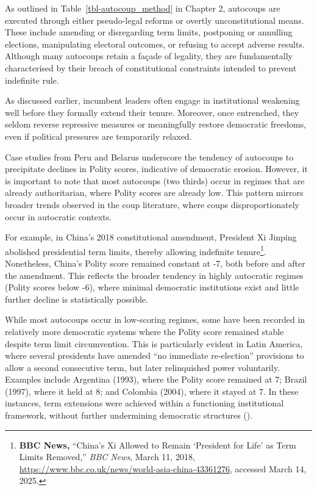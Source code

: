 \documentclass[
  12pt,
]{report}
\begin{document}
As outlined in Table~\ref{tbl-autocoup_method} in Chapter 2, autocoups
are executed through either pseudo-legal reforms or overtly
unconstitutional means. These include amending or disregarding term
limits, postponing or annulling elections, manipulating electoral
outcomes, or refusing to accept adverse results. Although many autocoups
retain a façade of legality, they are fundamentally characterised by
their breach of constitutional constraints intended to prevent
indefinite rule.

As discussed earlier, incumbent leaders often engage in institutional
weakening well before they formally extend their tenure. Moreover, once
entrenched, they seldom reverse repressive measures or meaningfully
restore democratic freedoms, even if political pressures are temporarily
relaxed.

Case studies from Peru and Belarus underscore the tendency of autocoups
to precipitate declines in Polity scores, indicative of democratic
erosion. However, it is important to note that most autocoups (two
thirds) occur in regimes that are already authoritarian, where Polity
scores are already low. This pattern mirrors broader trends observed in
the coup literature, where coups disproportionately occur in autocratic
contexts.

For example, in China's 2018 constitutional amendment, President Xi
Jinping abolished presidential term limits, thereby allowing indefinite
tenure\footnote{\textbf{BBC News,} ``China's Xi Allowed to Remain
  `President for Life' as Term Limits Removed,'' \emph{BBC News}, March
  11, 2018, \url{https://www.bbc.co.uk/news/world-asia-china-43361276},
  accessed March 14, 2025.}. Nonetheless, China's Polity score remained
constant at -7, both before and after the amendment. This reflects the
broader tendency in highly autocratic regimes (Polity scores below -6),
where minimal democratic institutions exist and little further decline
is statistically possible.

While most autocoups occur in low-scoring regimes, some have been
recorded in relatively more democratic systems where the Polity score
remained stable despite term limit circumvention. This is particularly
evident in Latin America, where several presidents have amended ``no
immediate re-election'' provisions to allow a second consecutive term,
but later relinquished power voluntarily. Examples include Argentina
(1993), where the Polity score remained at 7; Brazil (1997), where it
held at 8; and Colombia (2004), where it stayed at 7. In these
instances, term extensions were achieved within a functioning
institutional framework, without further undermining democratic
structures ().
\end{document}

